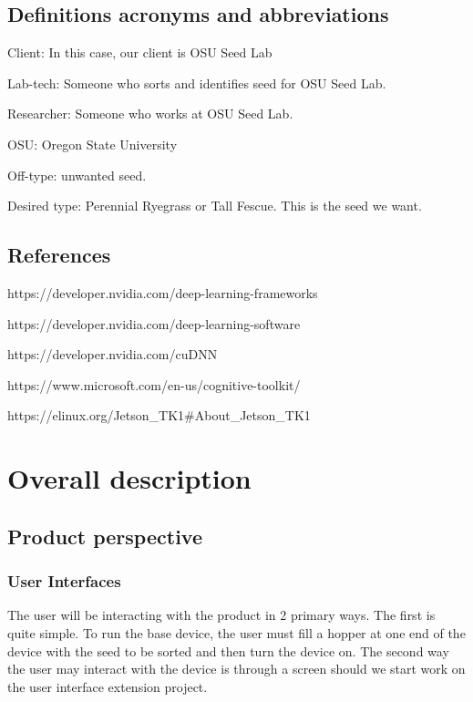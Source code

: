 \documentclass[onecolumn, draftclsnofoot,10pt, compsoc]{IEEEtran}
\begin{document}
	\subsection{Definitions acronyms and abbreviations}
	
	Client: In this case, our client is OSU Seed Lab
	
	Lab-tech: Someone who sorts and identifies seed for OSU Seed Lab.
	
	Researcher: Someone who works at OSU Seed Lab.
	
	OSU: Oregon State University
	
	Off-type: unwanted seed.
	
	Desired type: Perennial Ryegrass or Tall Fescue. This is the seed we want.
	
	\subsection{References}
	https://developer.nvidia.com/deep-learning-frameworks
	
	https://developer.nvidia.com/deep-learning-software
	
	https://developer.nvidia.com/cuDNN
	
	https://www.microsoft.com/en-us/cognitive-toolkit/
	
	https://elinux.org/Jetson\_TK1\#About\_Jetson\_TK1
	
	
	\section{Overall description}
	
	\subsection{Product perspective}
	
	\subsubsection{User Interfaces}
	The user will be interacting with the product in 2 primary ways.
	The first is quite simple.
	To run the base device, the user must fill a hopper at one end of the device with the seed to be sorted and then turn the device on.
	The second way the user may interact with the device is through a screen should we start work on the user interface extension project.
\end{document}
